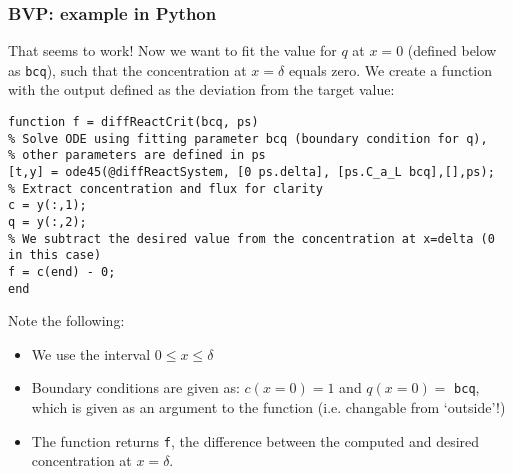 {\nologo
\begin{frame}[fragile]
  \frametitle{BVP: example in Python}
  That seems to work! Now we want to fit the value for $q$ at $x=0$ (defined below as \lstinline$bcq$), such that the concentration at $x=\delta$ equals zero. We create a function with the output defined as the deviation from the target value:
  \begin{lstlisting}
function f = diffReactCrit(bcq, ps)
% Solve ODE using fitting parameter bcq (boundary condition for q),
% other parameters are defined in ps
[t,y] = ode45(@diffReactSystem, [0 ps.delta], [ps.C_a_L bcq],[],ps);
% Extract concentration and flux for clarity
c = y(:,1);
q = y(:,2);
% We subtract the desired value from the concentration at x=delta (0 in this case)
f = c(end) - 0; 
end
  \end{lstlisting}
  \pause
  Note the following:
  \begin{itemize}
    \item We use the interval $0\leq x \leq \delta$
    \item Boundary conditions are given as: $c(x=0)=1$ and $q(x=0)=$ \lstinline$bcq$, which is given as an argument to the function (i.e. changable from `outside'!)
    \item The function returns \lstinline$f$, the difference between the computed and desired concentration at $x=\delta$.
  \end{itemize}
\end{frame}
}

